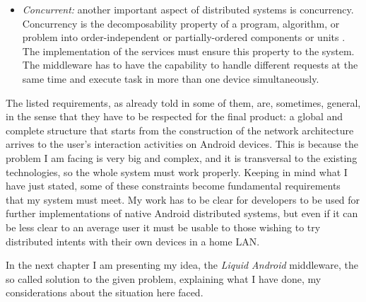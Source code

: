\begin{itemize}
	\item \textit{Concurrent:} another important aspect of distributed systems is concurrency. Concurrency is the decomposability property of a program, algorithm, or problem into order-independent or partially-ordered components or units \cite{lamport1978time}. The implementation of the services must ensure this property to the system. The middleware has to have the capability to handle different requests at the same time and execute task in more than one device simultaneously.
	
\end{itemize}
The listed requirements, as already told in some of them, are, sometimes, general, in the sense that they have to be respected for the final product: a global and complete structure that starts from the construction of the network architecture arrives to the user's interaction activities on Android devices. This is because the problem I am facing is very big and complex, and it is transversal to the existing technologies, so the whole system must work properly. Keeping in mind what I have just stated, some of these constraints become fundamental requirements that my system must meet. My work has to be clear for developers to be used for further implementations of native Android distributed systems, but even if it can be less clear to an average user it must be usable to those wishing to try distributed intents with their own devices in a home LAN.

\bigskip
\bigskip
\bigskip
\bigskip
\bigskip
\bigskip
\par
In the next chapter I am presenting my idea, the \textit{Liquid Android} middleware, the so called solution to the given problem, explaining what I have done, my considerations about the situation here faced.

%
